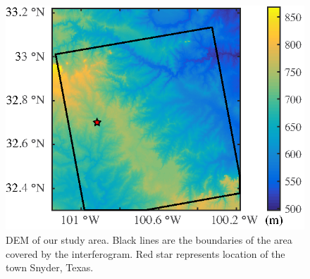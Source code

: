 \clearpage
\begin{figure}
	\centering
	\includegraphics{figs_paper3/Fig3.eps}	
	\caption[DEM of our study area.]{DEM of our study area.  Black lines are the boundaries of the area covered by the interferogram.  Red star represents location of the town Snyder, Texas.}
	\label{fig:chpt5_fig3}
\end{figure}

